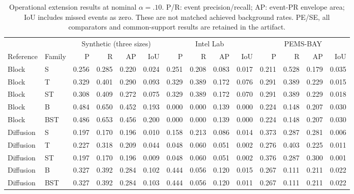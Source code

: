 \begin{table}[t]\centering\small
\caption{Operational extension results at nominal $\alpha=.10$. P/R: event precision/recall; AP: event-PR envelope area; IoU includes missed events as zero. These are not matched achieved background rates. PE/SE, all comparators and common-support results are retained in the artifact.}\label{tab:main}
\begin{tabular}{llrrrrrrrrrrrr}\toprule
&&\multicolumn{4}{c}{Synthetic (three sizes)}&\multicolumn{4}{c}{Intel Lab}&\multicolumn{4}{c}{PEMS-BAY}\\
Reference&Family&P&R&AP&IoU&P&R&AP&IoU&P&R&AP&IoU\\\midrule
Block & S & 0.256 & 0.285 & 0.220 & 0.024 & 0.251 & 0.208 & 0.083 & 0.017 & 0.211 & 0.528 & 0.179 & 0.035 \\
Block & T & 0.329 & 0.401 & 0.290 & 0.093 & 0.329 & 0.389 & 0.172 & 0.076 & 0.291 & 0.389 & 0.229 & 0.015 \\
Block & ST & 0.308 & 0.409 & 0.272 & 0.075 & 0.329 & 0.389 & 0.172 & 0.070 & 0.291 & 0.389 & 0.229 & 0.018 \\
Block & B & 0.484 & 0.650 & 0.452 & 0.193 & 0.000 & 0.000 & 0.139 & 0.000 & 0.224 & 0.148 & 0.207 & 0.030 \\
Block & BST & 0.486 & 0.653 & 0.456 & 0.200 & 0.000 & 0.000 & 0.139 & 0.000 & 0.224 & 0.148 & 0.207 & 0.030 \\
\midrule
Diffusion & S & 0.197 & 0.170 & 0.196 & 0.010 & 0.158 & 0.213 & 0.086 & 0.014 & 0.373 & 0.287 & 0.281 & 0.006 \\
Diffusion & T & 0.227 & 0.318 & 0.209 & 0.044 & 0.048 & 0.060 & 0.051 & 0.002 & 0.276 & 0.403 & 0.225 & 0.011 \\
Diffusion & ST & 0.197 & 0.170 & 0.196 & 0.009 & 0.048 & 0.060 & 0.051 & 0.002 & 0.376 & 0.287 & 0.300 & 0.001 \\
Diffusion & B & 0.327 & 0.392 & 0.284 & 0.102 & 0.444 & 0.056 & 0.120 & 0.015 & 0.267 & 0.111 & 0.211 & 0.022 \\
Diffusion & BST & 0.327 & 0.392 & 0.284 & 0.103 & 0.444 & 0.056 & 0.120 & 0.011 & 0.267 & 0.111 & 0.211 & 0.022 \\
\midrule
\bottomrule\end{tabular}\end{table}
